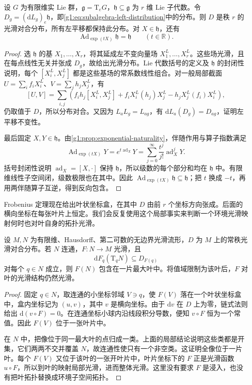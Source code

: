 \begin{proposition}\label{g1:prop:lie-subalgebra-left-distribution}
	设 \(G\) 为有限维实 Lie 群，\(\mathfrak g=\mathrm{T}_eG\)，\(\mathfrak h\subseteq\mathfrak g\) 为 \(r\) 维 Lie 子代数。令 \(D_g=(\mathrm{d}L_g)_e\mathfrak h\)，即\eqref{g1:eq:subalgebra-left-distribution}中的分布。则 \(D\) 是秩 \(r\) 的光滑对合分布，所有左平移都保持此分布。对 \(X\in\mathfrak h\)，还有
	\[
		\operatorname{Ad}_{\exp(tX)}\mathfrak h=\mathfrak h\qquad(t\in\mathbb R).
	\]
\end{proposition}
\begin{proof}
	选 \(\mathfrak h\) 的基 \(X_1,\ldots,X_r\)，将其延成左不变向量场 \(X_1^L,\ldots,X_r^L\)。这些场光滑，且在每点线性无关并张成 \(D_g\)，故给出光滑分布。Lie 代数括号的定义及 \(\mathfrak h\) 的封闭性说明，每个 \([X_i^L,X_j^L]\) 都是这些基场的常系数线性组合。对一般局部截面 \(U=\sum_i f_iX_i^L\)、\(V=\sum_j h_jX_j^L\)，有
	\[
		[U,V]=\sum_{i,j}\left(f_ih_j[X_i^L,X_j^L]
		+f_iX_i^L(h_j)X_j^L-h_jX_j^L(f_i)X_i^L\right),
	\]
	仍取值于 \(D\)，所以分布对合。又因为 \(L_aL_g=L_{ag}\)，有 \(\mathrm{d}L_a(D_g)=D_{ag}\)，证明左平移不变性。

	最后固定 \(X,Y\in\mathfrak h\)。由\cref{g1:prop:exponential-naturality}，伴随作用与算子指数满足
	\[
		\operatorname{Ad}_{\exp(tX)}Y
		=e^{t\operatorname{ad}_X}Y
		=\sum_{j=0}^{\infty}\frac{t^j}{j!}\operatorname{ad}_X^jY.
	\]
	括号封闭性说明 \(\operatorname{ad}_X=[X,\cdot]\) 保持 \(\mathfrak h\)，所以级数的每个部分和均在 \(\mathfrak h\) 中。有限维线性子空间闭，级数极限也在其中。因此 \(\operatorname{Ad}_{\exp(tX)}\mathfrak h\subseteq\mathfrak h\)；把 \(t\) 换成 \(-t\)，再用两伴随算子互逆，得到反向包含。
\end{proof}

Frobenius 定理现在给出叶状坐标盒，在其中 \(D\) 由前 \(r\) 个坐标方向张成。后面的横向坐标在每张叶片上恒定。我们会反复使用这个局部事实来判断一个环境光滑映射何时也对叶自身的拓扑光滑。

\begin{lemma}\label{g1:lem:leaf-valued-map}
	设 \(M,N\) 为有限维、Hausdorff、第二可数的无边界光滑流形，\(D\) 为 \(M\) 上的常秩光滑对合分布。若 \(N\) 连通，\(F:N\to M\) 光滑，且
	\[
		\mathrm{d}F_q(\mathrm{T}_qN)\subseteq D_{F(q)}
	\]
	对每个 \(q\in N\) 成立，则 \(F(N)\) 包含在一片最大叶中。将值域限制为该叶后，\(F\) 对叶的光滑结构仍然光滑。
\end{lemma}
\begin{proof}
	固定 \(q\in N\)，取连通的小坐标邻域 \(V\ni q\)，使 \(F(V)\) 落在一个叶状坐标盒中，盒内坐标记为 \((u,v)\)，其中 \(v\) 是横向坐标。由于 \(\mathrm{d}v\) 在 \(D\) 上为零，链式法则给出 \(\mathrm{d}(v\circ F)=0\)。在连通坐标小球内沿线段积分导数，便知 \(v\circ F\) 恒为一个常值。因此 \(F(V)\) 位于一张叶片中。

	在 \(N\) 中，把像位于同一最大叶的点归成一类。上面的局部结论说明这些类都是开集，它们两两不交并覆盖 \(N\)，故连通性使只有一个非空类。这证明全像位于一片叶。每个 \(F(V)\) 又位于该叶的一张开叶片中，叶片坐标下的 \(F\) 正是光滑函数 \(u\circ F\)，所以到叶的映射局部光滑，进而整体光滑。这里没有要求 \(F\) 是浸入，也没有把叶拓扑替换成环境子空间拓扑。
\end{proof}

